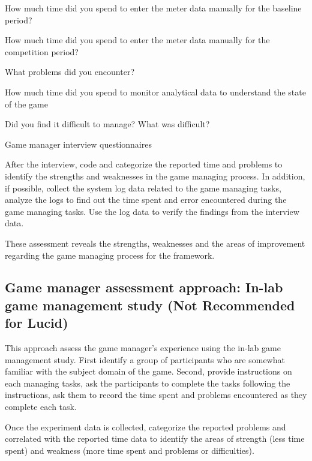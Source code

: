 \documentclass[11pt,oneside]{book}
\begin{document}
\begin{table}[ht!]
\begin{mybox}
\begin{compactenum}
\item How much time did you spend to enter the meter data manually for the baseline period?
\item How much time did you spend to enter the meter data manually for the competition period?    
\item What problems did you encounter?
\item How much time did you spend to monitor analytical data to understand the state of the game
\item Did you find it difficult to manage? What was difficult?
\end{compactenum}
\end{mybox}
\caption{Game manager interview questionnaires}
\label{fig:game-manager-interview}  
\end{table}

After the interview, code and categorize the reported time and problems to identify the strengths and weaknesses in the game managing process. In addition, if possible, collect the system log data related to the game managing tasks, analyze the logs to find out the time spent and error encountered during the game managing tasks. Use the log data to verify the findings from the interview data.

These assessment reveals the strengths, weaknesses and the areas of improvement regarding the game managing process for the framework.

\subsection{Game manager assessment approach: In-lab game management study (Not Recommended for Lucid)}
\label{In-lab game management study}

This approach assess the game manager's experience using the in-lab game management study.  First identify a group 
of participants who are somewhat familiar with the subject domain of the game. Second, provide instructions on 
each managing tasks, ask the participants to complete the tasks following the instructions, ask them to record 
the time spent and problems encountered as they complete each task.

Once the experiment data is collected, categorize the reported problems and correlated with the reported time data 
to identify the areas of strength (less time spent) and weakness (more time spent and problems or difficulties). 
\end{document}
